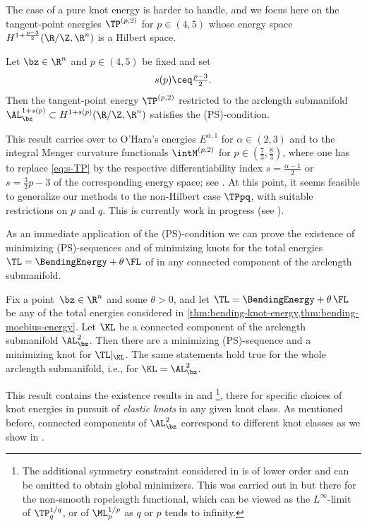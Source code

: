 The case of a pure knot energy  is harder to handle, and we focus
here on the tangent-point energies $\TP^{(p,2)}$ for $p\in (4,5)$ whose
energy space $H^{1+\frac{p-3}2}(\R/\Z,\R^n)$ is a Hilbert space.
\begin{theorem}
\label{thm:PS-TP}
Let $\bz\in\R^n$ and $p\in (4,5)$ be fixed and set
\begin{equation}\label{eq:s-TP}
        \textstyle
        s(p)\ceq\frac{p-3}{2}.
\end{equation}
Then the tangent-point energy $\TP^{(p,2)}$ restricted to
the arclength submanifold $\AL^{1+s(p)}_\bz\subset H^{1+s(p)}(\R/\Z,\R^n)$
satisfies the {\rm (PS)}-condition.
\end{theorem}
This result carries over to O'Hara's energies $E^{\alpha,1}$ for 
$\alpha\in (2,3)$ and to the integral Menger curvature functionals
$\intM^{(p,2)}$ for $p\in (\frac73,\frac83)$,   where
one has to replace \cref{eq:s-TP} by the respective differentiability
index $s=\frac{\alpha-1}2$ or 
$s=\frac{3}{2} p -3$ of the corresponding energy space;
see \cite{freches_2025}. At this point, it seems feasible to generalize our methods to the non-Hilbert case $ \TPpq $, with suitable restrictions on $ p $ and $ q $. This is currently work in progress (see \cite{frechesetal_2026}). 

As an immediate application of the (PS)-condition we can
prove the existence of minimizing (PS)-sequences and of
minimizing knots for the total energies
$\TL = \BendingEnergy + \theta \, \FL$ of 
in any connected component of the arclength
submanifold.

\begin{corollary}
\label{cor:minimizing-knots-total-energy}
Fix a point \,$\bz\in\R^n$ and some $\theta>0$, and let $\TL = \BendingEnergy + \theta \, \FL$
be any of the total energies considered 
in \cref{thm:bending-knot-energy,thm:bending-moebius-energy}. 
Let $\KL$ be a connected component of the arclength submanifold $\AL^2_\bz$.
Then there are a minimizing {\rm (PS)}-sequence and
a minimizing knot for $\TL|_{\KL}$.
The same statements hold true for the whole arclength submanifold, i.e., for $\KL = \AL^2_\bz$.
\end{corollary}
This result contains the existence results in
\cite[Theorem 3.1]{vdm_1999} and \cite[Theorem 1.1]{gilsbach-etal_2023}\footnote{The additional symmetry constraint considered in \cite[Theorem 1.1]{gilsbach-etal_2023} is of lower order and can be omitted to obtain
global minimizers. This was carried
out  in \cite[Theorem 2.1]{gerlach-etal_2017} but there
for the non-smooth ropelength
functional, which  can be viewed 
as the $L^\infty$-limit of $\TP_q^{1/q}$, or of
$\ML_p^{1/p}$ as $q$ or $p$ tends to infinity.}, there
for specific
choices of knot energies
in pursuit of \emph{elastic knots} in any given knot class.  
As mentioned before,
connected components of $\AL^2_\bz$ correspond to
different knot classes as we show in .

